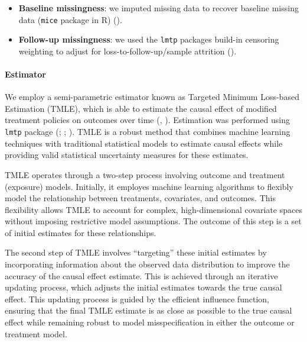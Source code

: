 \documentclass[
  singlecolumn]{article}
\let\oldparagraph\paragraph
\renewcommand{\paragraph}[1]{\oldparagraph{#1}\mbox{}}
\providecommand{\tightlist}{%
  \setlength{\itemsep}{0pt}\setlength{\parskip}{0pt}}\usepackage{longtable,booktabs,array}
\begin{document}
\begin{itemize}
\tightlist
\item
  \textbf{Baseline missingness}: we imputed missing data to recover
  baseline missing data (\texttt{mice} package in R)
  ().
\item
  \textbf{Follow-up missingness}: we used the \texttt{lmtp} packages
  build-in censoring weighting to adjust for loss-to-follow-up/sample
  attrition ().
\end{itemize}

\paragraph{Estimator}\label{estimator}

We employ a semi-parametric estimator known as Targeted Minimum
Loss-based Estimation (TMLE), which is able to estimate the causal
effect of modified treatment policies on outcomes over time
(,
). Estimation was performed using
\texttt{lmtp} package (; ;
). TMLE is a robust
method that combines machine learning techniques with traditional
statistical models to estimate causal effects while providing valid
statistical uncertainty measures for these estimates.

TMLE operates through a two-step process involving outcome and treatment
(exposure) models. Initially, it employes machine learning algorithms to
flexibly model the relationship between treatments, covariates, and
outcomes. This flexibility allows TMLE to account for complex,
high-dimensional covariate spaces without imposing restrictive model
assumptions. The outcome of this step is a set of initial estimates for
these relationships.

The second step of TMLE involves ``targeting'' these initial estimates
by incorporating information about the observed data distribution to
improve the accuracy of the causal effect estimate. This is achieved
through an iterative updating process, which adjusts the initial
estimates towards the true causal effect. This updating process is
guided by the efficient influence function, ensuring that the final TMLE
estimate is as close as possible to the true causal effect while
remaining robust to model misspecification in either the outcome or
treatment model.
\end{document}
